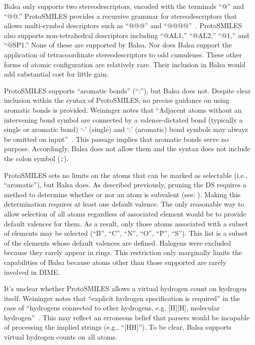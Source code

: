 \documentclass{article}
\def\ttt{\texttt}
\begin{document}
Balsa only supports two stereodescriptors, encoded with the terminals \enquote{@} and \enquote{@@.} ProtoSMILES provides a recursive grammar for stereodescriptors that allows multi-symbol descriptors such as \enquote{@@@} and \enquote{@@@@}~\cite[p.~94]{weininger:2003}. ProtoSMILES also supports non-tetrahedral descriptors including \enquote{@AL1,} \enquote{@AL2,} \enquote{@1,} and \enquote{@SP1.} None of these are supported by Balsa. Nor does Balsa support the application of tetracoordinate stereodescriptors to odd cumulenes. These other forms of atomic configuration are relatively rare. Their inclusion in Balsa would add substantial cost for little gain.

ProtoSMILES supports \enquote{aromatic bonds} (\enquote{:}), but Balsa does not. Despite clear inclusion within the syntax of ProtoSMILES, no precise guidance on using aromatic bonds is provided. Weininger notes that \enquote{Adjacent atoms without an intervening bond symbol are connected by a valence-dictated bond (typically a single or aromatic bond) \enquote{-} (single) and \enquote{:} (aromatic) bond symbols may always be omitted on input}~\cite[p.~85]{weininger:2003}. This passage implies that aromatic bonds serve no purpose. Accordingly, Balsa does not allow them and the syntax does not include the colon symbol (\ttt{:}).

ProtoSMILES sets no limits on the atoms that can be marked as selectable (i.e., \enquote{aromatic}), but Balsa does. As described previously, pruning the DS requires a method to determine whether or nor an atom is subvalent (see: ). Making this determination requires at least one default valence. The only reasonable way to allow selection of all atoms regardless of associated element would be to provide default valences for them. As a result, only those atoms associated with a subset of elements may be selected (\enquote{B}, \enquote{C}, \enquote{N}, \enquote{O}, \enquote{P}, \enquote{S}). This list is a subset of the elements whose default valences are defined. Halogens were excluded because they rarely appear in rings. This restriction only marginally limits the capabilities of Balsa because atoms other than those supported are rarely involved in DIME.

It's unclear whether ProtoSMILES allows a virtual hydrogen count on hydrogen itself. Weininger notes that \enquote{explicit hydrogen specification is required} in the case of \enquote{hydrogens connected to other hydrogens, e.g. [H][H], molecular hydrogen}~\cite[p.~97]{weininger:2003}. This may reflect an erroneous belief that parsers would be incapable of processing the implied strings (e.g., \enquote{[HH]}). To be clear, Balsa supports virtual hydrogen counts on all atoms.
\end{document}
